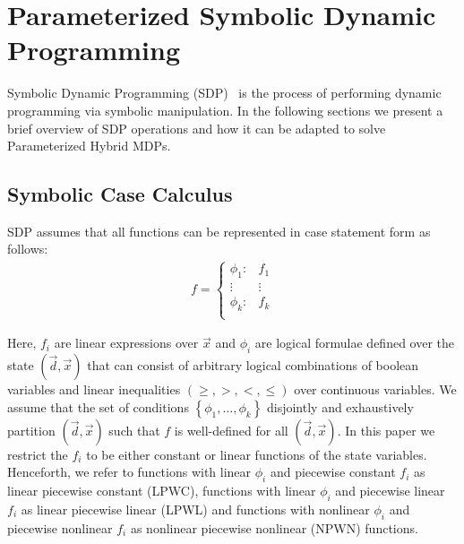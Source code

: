 \section{Parameterized Symbolic Dynamic Programming}
\label{sec:sdp}

Symbolic Dynamic Programming (SDP)~\cite{Boutilier_IJCAI_2001} is the process of performing dynamic programming via symbolic manipulation. In the following sections we present a brief overview of SDP operations and how it can be adapted to solve Parameterized Hybrid MDPs.

\subsection{Symbolic Case Calculus}

SDP assumes that all functions can be represented in case statement form \cite{Boutilier_IJCAI_2001} as follows:
{\footnotesize 
    \abovedisplayskip=5pt
    \belowdisplayskip=0pt
    \begin{align*}
        f = 
        \begin{cases}
            \phi_1: & f_1 \\ 
            \vdots & \vdots\\ 
            \phi_k: & f_k \\ 
        \end{cases}
    \end{align*}
}%

Here, {\footnotesize$ f_i $} are linear expressions over {\footnotesize$ \vec{x} $} and {\footnotesize$\phi_i$} are logical formulae defined over the state {\footnotesize$( \vec{d}, \vec{x})$} that can consist of arbitrary logical combinations of boolean variables and linear inequalities {\footnotesize$\left( \geq, >, <, \leq \right)$} over continuous variables. We assume that the set of conditions {\footnotesize$\left\lbrace \phi_1, \ldots, \phi_k \right\rbrace$} disjointly and exhaustively partition {\footnotesize$(\vec{d}, \vec{x})$} such that {\footnotesize$f$} is well-defined for all {\footnotesize$(\vec{d}, \vec{x})$}. In this paper we restrict the {\footnotesize$f_i$} to be either constant or linear functions of the state variables. Henceforth, we refer to functions with linear {\footnotesize$\phi_i$} and piecewise constant {\footnotesize$f_i$} as linear piecewise constant (LPWC), functions with linear {\footnotesize$\phi_i$} and piecewise linear {\footnotesize$f_i$} as linear piecewise linear (LPWL) and functions with nonlinear {\footnotesize$\phi_i$} and piecewise nonlinear {\footnotesize$f_i$} as nonlinear piecewise nonlinear (NPWN) functions.

